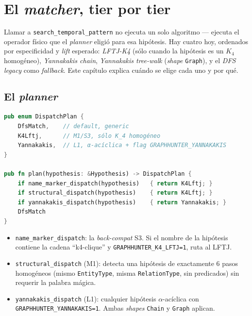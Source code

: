 \chapter{El \emph{matcher}, tier por tier}
\label{cap:matcher}

\begin{intuicion}
Llamar a \texttt{search\_temporal\_pattern} no ejecuta un solo
algoritmo --- ejecuta el operador físico que el \emph{planner} eligió
para esa hipótesis. Hay cuatro hoy, ordenados por especificidad y
\emph{lift} esperado: \emph{LFTJ-K4} (sólo cuando la hipótesis es un
\(K_4\) homogéneo), \emph{Yannakakis chain}, \emph{Yannakakis tree-walk}
(\emph{shape} \texttt{Graph}), y el \emph{DFS legacy} como
\emph{fallback}. Este capítulo explica cuándo se elige cada uno y por
qué.
\end{intuicion}

\section{El \emph{planner}}

\begin{lstlisting}[language=Rust]
pub enum DispatchPlan {
    DfsMatch,    // default, generic
    K4Lftj,      // M1/S3, sólo K_4 homogéneo
    Yannakakis,  // L1, α-acíclica + flag GRAPHHUNTER_YANNAKAKIS
}

pub fn plan(hypothesis: &Hypothesis) -> DispatchPlan {
    if name_marker_dispatch(hypothesis)   { return K4Lftj; }
    if structural_dispatch(hypothesis)    { return K4Lftj; }
    if yannakakis_dispatch(hypothesis)    { return Yannakakis; }
    DfsMatch
}
\end{lstlisting}

\begin{itemize}
    \item \texttt{name\_marker\_dispatch}: la \emph{back-compat} S3.
    Si el nombre de la hipótesis contiene la cadena ``k4-clique'' y
    \texttt{GRAPHHUNTER\_K4\_LFTJ=1}, ruta al LFTJ.
    \item \texttt{structural\_dispatch} (M1): detecta una hipótesis
    de exactamente 6 pasos homogéneos (mismo \texttt{EntityType},
    misma \texttt{RelationType}, sin predicados) sin requerir la
    palabra mágica.
    \item \texttt{yannakakis\_dispatch} (L1): cualquier hipótesis
    \(\alpha\)-acíclica con \texttt{GRAPHHUNTER\_YANNAKAKIS=1}.
    Ambas \emph{shapes} \texttt{Chain} y \texttt{Graph} aplican.
\end{itemize}

